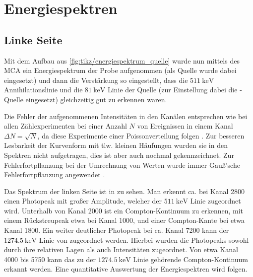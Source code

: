 \section{Energiespektren}
\subsection*{Linke Seite}
Mit dem Aufbau aus \ref{fig:tikz/energiespektrum_quelle} wurde nun mittels des MCA ein Energiespektrum der \na Probe aufgenommen (als Quelle wurde dabei \na eingesetzt) und dann die Verstärkung so eingestellt, dass die $\SI{511}{\kilo\eV}$ Annihilationslinie und die $\SI{81}{\kilo\eV}$ Linie der \ba Quelle (zur Einstellung dabei die \ba-Quelle eingesetzt) gleichzeitig gut zu erkennen waren.


Die Fehler der aufgenommenen Intensitäten in den Kanälen entsprechen wie bei allen Zählexperimenten bei einer Anzahl $N$ von Ereignissen in einem Kanal $\Delta N =\sqrt{N}$, da diese Experimente einer Poissonverteilung folgen \cite[788]{kolanoskiwermerdetektoren}. Zur besseren Lesbarkeit der Kurvenform mit tlw. kleinen Häufungen wurden sie in den Spektren nicht aufgetragen, dies ist aber auch nochmal gekennzeichnet. Zur Fehlerfortpflanzung bei der Umrechnung von Werten wurde immer Gauß'sche Fehlerfortpflanzung angewendet \cite[8-9]{gerthsen}.


Das Spektrum der linken Seite ist in  zu sehen. Man erkennt ca. bei Kanal 2800 einen Photopeak mit großer Amplitude, welcher der $\SI{511}{\kilo\eV}$ Linie zugeordnet wird. Unterhalb von Kanal 2000 ist ein Compton-Kontinuum zu erkennen, mit einem Rückstreupeak etwa bei Kanal 1000, und einer Compton-Kante bei etwa Kanal 1800. Ein weiter deutlicher Photopeak bei ca. Kanal 7200 kann der $\SI{1274.5}{\kilo\eV}$ Linie von \na zugeordnet werden. Hierbei wurden die Photopeaks sowohl durch ihre relativen Lagen als auch Intensitäten zugeordnet. Von etwa Kanal 4000 bis 5750 kann das zu der $\SI{1274.5}{\kilo\eV}$ Linie gehörende Compton-Kontinuum erkannt werden. Eine quantitative Auswertung der Energiespektren wird folgen.


